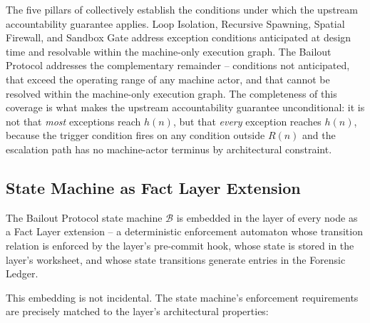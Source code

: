 The five pillars of \bxthree{} collectively establish the conditions under which
the upstream accountability guarantee applies. Loop Isolation, Recursive Spawning,
Spatial Firewall, and Sandbox Gate address exception conditions anticipated at design
time and resolvable within the machine-only execution graph. The Bailout Protocol
addresses the complementary remainder -- conditions not anticipated, that exceed the
operating range of any machine actor, and that cannot be resolved within the machine-only
execution graph. The completeness of this coverage is what makes the upstream
accountability guarantee unconditional: it is not that \emph{most} exceptions reach
$h(n)$, but that \emph{every} exception reaches $h(n)$, because the trigger condition
fires on any condition outside $R(n)$ and the escalation path has no machine-actor
terminus by architectural constraint.

\subsection{State Machine as Fact Layer Extension}\label{sec:state-machine-fact-layer}

The Bailout Protocol state machine $\mathcal{B}$ is embedded in the \fact{} layer of
every \bxthree{} node as a Fact Layer extension -- a deterministic enforcement automaton
whose transition relation is enforced by the \fact{} layer's pre-commit hook, whose
state is stored in the \fact{} layer's worksheet, and whose state transitions generate
entries in the Forensic Ledger.

This embedding is not incidental. The state machine's enforcement requirements are
precisely matched to the \fact{} layer's architectural properties:

